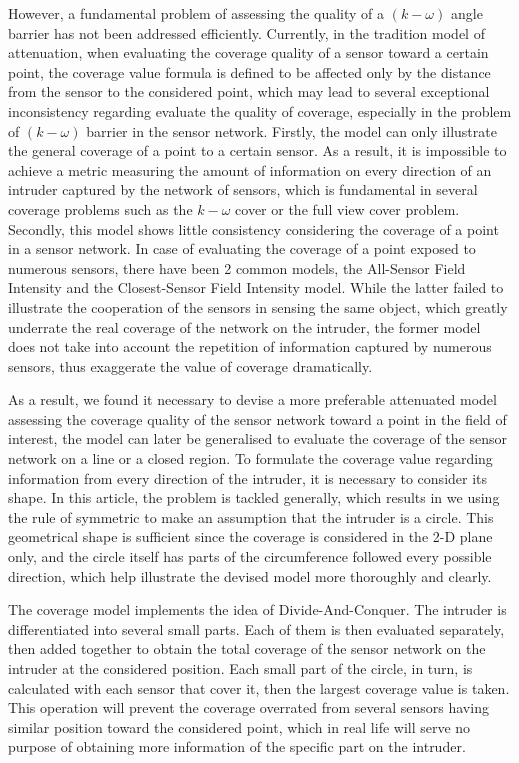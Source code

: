 \documentclass[3p]{elsarticle}
\begin{document}
However, a fundamental problem of assessing the quality of a $(k-\omega)$ angle barrier has not been addressed efficiently. Currently, in the tradition model of attenuation, when evaluating the coverage quality of a sensor toward a certain point, the coverage value formula is defined to be affected only by the distance from the sensor to the considered point, which may lead to several exceptional inconsistency regarding evaluate the quality of coverage, especially in the problem of $(k-\omega)$ barrier in the sensor network. Firstly, the model can only illustrate the general coverage of a point to a certain sensor. As a result, it is impossible to achieve a metric measuring the amount of information on every direction of an intruder captured by the network of sensors, which is fundamental in several coverage problems such as the $k-\omega$ cover or the full view cover problem. Secondly, this model shows little consistency considering the coverage of a point in a sensor network. In case of evaluating the coverage of a point exposed to numerous sensors, there have been 2 common models, the All-Sensor Field Intensity and the Closest-Sensor Field Intensity model. While the latter failed to illustrate the cooperation of the sensors in sensing the same object, which greatly underrate the real coverage of the network on the intruder, the former model does not take into account the repetition of information captured by numerous sensors, thus exaggerate the value of coverage dramatically.\par
%
As a result, we found it necessary to devise a more preferable attenuated model assessing the coverage quality of the sensor network toward a point in the field of interest, the model can later be generalised to evaluate the coverage of the sensor network on a line or a closed region. To formulate the coverage value regarding information from every direction of the intruder, it is necessary to consider its shape. In this article, the problem is tackled generally, which results in we using the rule of symmetric to make an assumption that the intruder is a circle. This geometrical shape is sufficient since the coverage is considered in the 2-D plane only, and the circle itself has parts of the circumference followed every possible direction, which help illustrate the devised model more thoroughly and clearly.\par
%
The coverage model implements the idea of Divide-And-Conquer. The intruder is differentiated into several small parts. Each of them is then evaluated separately, then added together to obtain the total coverage of the sensor network on the intruder at the considered position. Each small part of the circle, in turn, is calculated with each sensor that cover it, then the largest coverage value is taken. This operation will prevent the coverage overrated from several sensors having similar position toward the considered point, which in real life will serve no purpose of obtaining more information of the specific part on the intruder.\par
\end{document}
